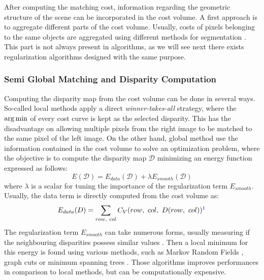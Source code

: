 After computing the matching cost, information regarding the geometric structure of the scene can be incorporated in the cost volume. A first approach is to aggregate different parts of the cost volume. Usually, costs of pixels belonging to the same objects are aggregated using different methods for segmentation \cite{ke_zhang_cross-based_2009, ji_superpixel_2021}. This part is not always present in algorithms, as we will see next there exists regularization algorithms designed with the same purpose. 

\subsubsection{Semi Global Matching and Disparity Computation}
Computing the disparity map from the cost volume can be done in several ways. So-called local methods apply a direct \textit{winner-takes-all} strategy, where the $\operatorname*{arg\,min}$ of every cost curve is kept as the selected disparity. This has the disadvantage on allowing multiple pixels from the right image to be matched to the same pixel of the left image. On the other hand, global method use the information contained in the cost volume to solve an optimization problem, where the objective is to compute the disparity map $\mathcal{D}$ minimizing an energy function expressed as follows:
\begin{equation}
    E(\mathcal{D}) = E_{data}(\mathcal{D}) + \lambda E_{smooth}(\mathcal{D})
\end{equation}
where $\lambda$ is a scalar for tuning the importance of the regularization term $E_{smooth}$. Usually, the data term is directly computed from the cost volume as:
\begin{equation}\label{eq:global_methods}
    E_{data}(D) = \sum_{row,~col}C_V(row, ~col,~D(row, ~col))\commanue{C'est pas le même symbole D que dans la précédente équation}
\end{equation}
The regularization term $E_{smooth}$ can take numerous forms, usually measuring if the neighbouring disparities possess similar values \cite{scharstein_taxonomy_2001}. Then a local minimum for this energy is found using various methods, such as Markov Random Fields \cite{boykov_markov_1998, sun_stereo_2003}, graph cuts \cite{kolmogorov_computing_2001} or minimum spanning trees \cite{zureiki_stereo_2008, qingxiong_yang_non-local_2012}. Those algorithms improves performances in comparison to local methods, but can be computationally expensive.

